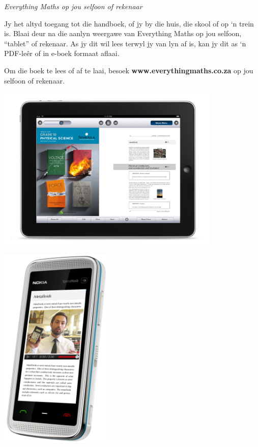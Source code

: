 \newpage
\thispagestyle{empty}

{\normalfont\sffamily\fontsize{22}\normalfont\itshape Everything Maths op jou selfoon of rekenaar} \par

{
Jy het altyd toegang tot die handboek, of jy by die huis, die skool of op ‘n trein is. Blaai deur na die aanlyn weergawe van Everything Maths op jou selfoon, “tablet” of rekenaar. As jy dit wil lees terwyl jy van lyn af is, kan jy dit as ‘n PDF-leêr of in e-boek formaat aflaai.\par


Om die boek te lees of af te laai, besoek \textbf{www.everythingmaths.co.za} op jou selfoon of rekenaar.} \vspace*{2cm}

\begin{center}
\begin{minipage}{0.4\textwidth}
\centering
\includegraphics[width=0.8\textwidth]{title_images/ipad.jpg}
\end{minipage}
\begin{minipage}{0.4\textwidth}
\centering
\includegraphics[width=0.4\textwidth]{title_images/phone.png}
\end{minipage}
\end{center}


